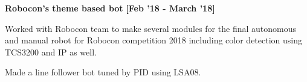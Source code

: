 \begin{itemize*}




    \item \textbf{\small{Robocon's theme based bot}} \hfill {\small{{\textbf{[Feb '18 - March '18]}}}}
    \begin{itemize*}
        \item Worked with Robocon team to make several modules for the final autonomous and manual robot for Robocon competition 2018 including color detection using TCS3200 and IP as well.
        \item Made a line follower bot tuned by PID using LSA08.
    \end{itemize*}

\end{itemize*}





